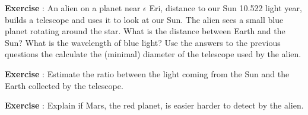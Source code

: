 \documentclass[12pt,a4paper]{article}
\numberwithin{equation}{section}
\numberwithin{figure}{section}
\newcounter{Exercise}
\numberwithin{table}{section}
\begin{document}
\begin{shaded}
\textbf{Exercise \theExercise {}} : An alien on a planet near $\epsilon$ Eri, distance to our Sun 10.522 light year, builds a telescope and uses it to look at our Sun. The alien sees a small blue planet rotating around the star. What is the distance between Earth and the Sun? What is the wavelength of blue light? Use the answers to the previous questions the calculate the (minimal) diameter of the telescope used by the alien.\end{shaded}
\begin{shaded}
\textbf{Exercise \theExercise {}} : Estimate the ratio between the light coming from the Sun and the Earth collected by the telescope.\end{shaded}
\begin{shaded}
\textbf{Exercise \theExercise {}} : Explain if Mars, the red planet, is easier harder to detect by the alien.\end{shaded}
\end{document}

